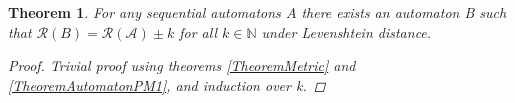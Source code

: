 \documentclass{article}
\newtheorem{theorem}{Theorem}
\begin{document}
\begin{theorem}
    For any sequential automatons $A$ there exists an automaton B such that $\mathcal{R}(B) = \mathcal{R(A)} \pm k$ for all $k\in \mathbb{N}$ under Levenshtein distance.
    \begin{proof}
        Trivial proof using theorems \ref{TheoremMetric} and \ref{TheoremAutomatonPM1}, and induction over k.
    \end{proof}
\end{theorem}
\end{document}
